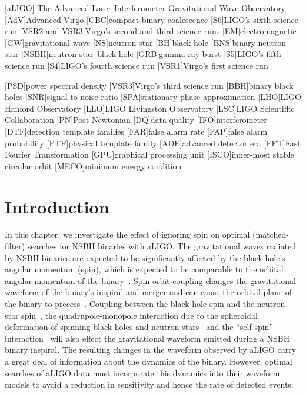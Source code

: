 [aLIGO]
{The Advanced Laser Interferometer Gravitational Wave Observatory}
[AdV]{Advanced Virgo}
[CBC]{compact binary coalescence}
[S6]{LIGO's sixth science run}
[VSR2 and VSR3]{Virgo's second and third science runs}
[EM]{electromagnetic}
[GW]{gravitational wave}
[NS]{neutron star}
[BH]{black hole}
[BNS]{binary neutron star}
[NSBH]{neutron-star--black-hole}
[GRB]{gamma-ray burst}
[S5]{LIGO's fifth science run}
[S4]{LIGO's fourth science run}
[VSR1]{Virgo's first science run}

[PSD]{power spectral density}
[VSR3]{Virgo's third science run}
[BBH]{binary black holes}
[SNR]{signal-to-noise ratio}
[SPA]{stationary-phase approximation}
[LHO]{LIGO Hanford Observatory}
[LLO]{LIGO Livingston Observatory}
[LSC]{LIGO Scientiffic Collaboration}
[PN]{Post-Newtonian}
[DQ]{data quality}
[IFO]{interferometer}
[DTF]{detection template families}
[FAR]{false alarm rate}
[FAP]{false alarm probability}
[PTF]{physical template family}
[ADE]{advanced detector era}
[FFT]{Fast Fourier Transformation}
[GPU]{graphical processing unit}
[ISCO]{inner-most stable circular orbit}
[MECO]{minimum energy condition}

\section{Introduction}
\label{sec:intro}

In this chapter, we investigate the effect of ignoring spin on optimal
(matched-filter) searches for \ac{NSBH} binaries with \ac{aLIGO}.
The gravitational waves radiated by \ac{NSBH} binaries are expected to be
significantly affected by the black hole's angular momentum
(spin), which is expected to be comparable to the orbital angular momentum of
the binary~\cite{Cutler:1992tc,Apostolatos:1994mx,Kidder:1992fr,Kidder:1995zr}.
Spin-orbit coupling changes the gravitational waveform of the binary's inspiral
and merger and can cause the orbital plane of the binary to
precess~\cite{Apostolatos:1994mx}. Coupling between the black hole spin and the
neutron star spin~\cite{Kidder:1995zr}, the quadrupole-monopole interaction due
to the spheroidal deformation of spinning black holes and neutron
stars~\cite{Poisson:1997ha} and the ``self-spin''
interaction~\cite{Mikoczi:2005dn} will also effect the gravitational waveform
emitted during a \ac{NSBH} binary inspiral.
The resulting changes in the waveform observed by \ac{aLIGO}
carry a great deal of information about the dynamics of the binary. However,
optimal searches of \ac{aLIGO} data must incorporate this dynamics into their
waveform models to avoid a reduction in sensitivity and hence the rate of
detected events.

